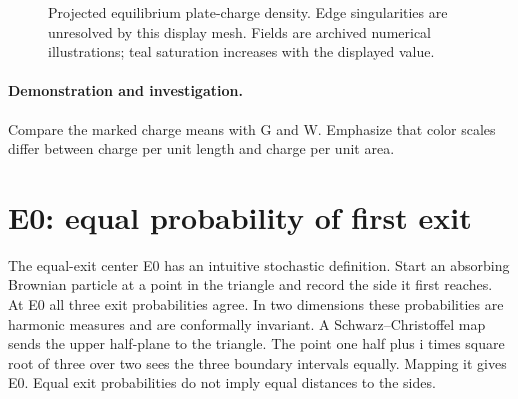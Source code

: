 \documentclass[11pt,oneside,openany]{book}
\begin{document}
\begin{figure}[htbp]
\caption[Projected equilibrium plate-charge density]{Projected equilibrium plate-charge density. Edge singularities are unresolved by this display mesh. Fields are archived numerical illustrations; teal saturation increases with the displayed value.}\label{fig:field-E3}
\end{figure}

\paragraph{Demonstration and investigation.} Compare the marked charge means with G and W. Emphasize that color scales differ between charge per unit length and charge per unit area.


\section{E0: equal probability of first exit}\label{sec:slide20}

The equal-exit center E0 has an intuitive stochastic definition. Start an absorbing Brownian particle at a point in the triangle and record the side it first reaches. At E0 all three exit probabilities agree. In two dimensions these probabilities are harmonic measures and are conformally invariant. A Schwarz--Christoffel map sends the upper half-plane to the triangle. The point one half plus i times square root of three over two sees the three boundary intervals equally. Mapping it gives E0. Equal exit probabilities do not imply equal distances to the sides.
\end{document}
